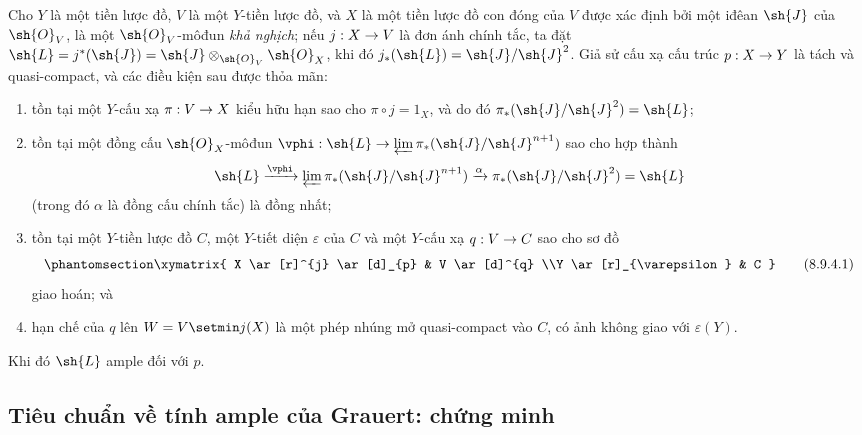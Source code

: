\documentclass[oneside,10pt]{amsart}
\makeatletter
\newcommand{\ega@arrow}[2]{\mathchoice{#1}{#2}{#2}{#2}}
\renewcommand{\to}{\ega@arrow{\longrightarrow}{\rightarrow}}
\newcommand{\oldpage}[2][]{\marginnote{\normalfont\footnotesize\textbf{#1}~|~#2}\ignorespaces}
\let\EGAOriginalLabel\label
\renewcommand{\label}[1]{\phantomsection\EGAOriginalLabel{#1}}
\makeatother
\begin{document}
\begin{proposition}[8.9.4]
\label{II.8.9.4}
Cho $Y$ là một tiền lược đồ, $V$ là một $Y$-tiền lược đồ, và $X$ là một tiền lược đồ con đóng của $V$ được xác định bởi một iđêan $\sh{J}$ của $\sh{O}_V$, là một $\sh{O}_V$-môđun \emph{khả nghịch};
nếu $j:X\to V$ là
\oldpage[II]{184}
đơn ánh chính tắc, ta đặt $\sh{L} = j^*(\sh{J}) = \sh{J}\otimes_{\sh{O}_V}\sh{O}_X$, khi đó $j_*(\sh{L})=\sh{J}/\sh{J}^2$.
Giả sử cấu xạ cấu trúc $p:X\to Y$ là tách và quasi-compact, và các điều kiện sau được thỏa mãn:
\begin{enumerate}
  \item[\rm{(i)}] tồn tại một $Y$-cấu xạ $\pi:V\to X$ kiểu hữu hạn sao cho $\pi\circ j=1_X$, và do đó $\pi_*(\sh{J}/\sh{J}^2)=\sh{L}$;
  \item[\rm{(ii)}] tồn tại một đồng cấu $\sh{O}_X$-môđun $\vphi:\sh{L}\to\varprojlim\pi_*(\sh{J}/\sh{J}^{n+1})$ sao cho hợp thành
    \[
      \sh{L}
      \xrightarrow{\vphi}
      \varprojlim \pi_*(\sh{J}/\sh{J}^{n+1})
      \xrightarrow{\alpha}
      \pi_*(\sh{J}/\sh{J}^2) = \sh{L}
    \]
    (trong đó $\alpha$ là đồng cấu chính tắc) là đồng nhất;
  \item[\rm{(iii)}] tồn tại một $Y$-tiền lược đồ $C$, một $Y$-tiết diện $\varepsilon$ của $C$ và một $Y$-cấu xạ $q:V\to C$ sao cho sơ đồ
    \[
    \label{II.8.9.4.1}
      \xymatrix{
        X
          \ar[r]^{j}
          \ar[d]_{p}
      & V
          \ar[d]^{q}
      \\Y
          \ar[r]_{\varepsilon}
      & C
      }
    \tag{8.9.4.1}
    \]
    giao hoán; và
  \item[\rm{(iv)}] hạn chế của $q$ lên $W=V\setmin j(X)$ là một phép nhúng mở quasi-compact vào $C$, có ảnh không giao với $\varepsilon(Y)$.
\end{enumerate}
Khi đó $\sh{L}$ ample đối với $p$.
\end{proposition}


\subsection{Tiêu chuẩn về tính ample của Grauert: chứng minh}
\label{subsection:II.8.10}
\end{document}

